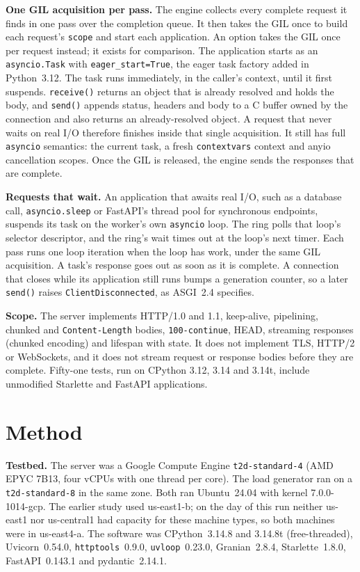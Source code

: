\documentclass[10pt,twocolumn,letterpaper]{article}
\newcommand{\code}[1]{\texttt{#1}}
\begin{document}
\textbf{One GIL acquisition per pass.} The engine collects every complete
request it finds in one pass over the completion queue. It then takes the
GIL once to build each request's \code{scope} and start each application. An
option takes the GIL once per request instead; it exists for comparison.
The application starts as an \code{asyncio.Task} with
\code{eager\_start=True}, the eager task factory added in Python~3.12. The
task runs immediately, in the caller's context, until it first suspends.
\code{receive()} returns an object that is already resolved and holds the
body, and \code{send()} appends status, headers and body to a C buffer
owned by the connection and also returns an already-resolved object. A
request that never waits on real I/O therefore finishes inside that single
acquisition. It still has full \code{asyncio} semantics: the current task,
a fresh \code{contextvars} context and anyio cancellation scopes. Once the
GIL is released, the engine sends the responses that are complete.

\textbf{Requests that wait.} An application that awaits real I/O, such as a
database call, \code{asyncio.sleep} or FastAPI's thread pool for synchronous
endpoints, suspends its task on the worker's own \code{asyncio} loop. The
ring polls that loop's selector descriptor, and the ring's wait times out at
the loop's next timer. Each pass runs one loop iteration when the loop has
work, under the same GIL acquisition. A task's response goes out as soon as
it is complete. A connection that closes while its application still runs
bumps a generation counter, so a later \code{send()} raises
\code{ClientDisconnected}, as ASGI~2.4 specifies.

\textbf{Scope.} The server implements HTTP/1.0 and 1.1, keep-alive,
pipelining, chunked and \code{Content-Length} bodies,
\code{100-continue}, HEAD, streaming responses (chunked encoding) and
lifespan with state. It does not implement TLS, HTTP/2 or WebSockets, and it
does not stream request or response bodies before they are complete.
Fifty-one tests, run on CPython 3.12, 3.14 and 3.14t, include unmodified
Starlette and FastAPI applications.

\section{Method}

\textbf{Testbed.} The server was a Google Compute Engine
\code{t2d-standard-4} (AMD EPYC 7B13, four vCPUs with one thread per core).
The load generator ran on a \code{t2d-standard-8} in the same zone. Both ran
Ubuntu~24.04 with kernel 7.0.0-1014-gcp. The earlier study used us-east1-b;
on the day of this run neither us-east1 nor us-central1 had capacity for
these machine types, so both machines were in us-east4-a. The software was
CPython~3.14.8 and 3.14.8t (free-threaded), Uvicorn~0.54.0,
\code{httptools}~0.9.0, \code{uvloop}~0.23.0, Granian~2.8.4,
Starlette~1.8.0, FastAPI~0.143.1 and pydantic~2.14.1.
\end{document}
